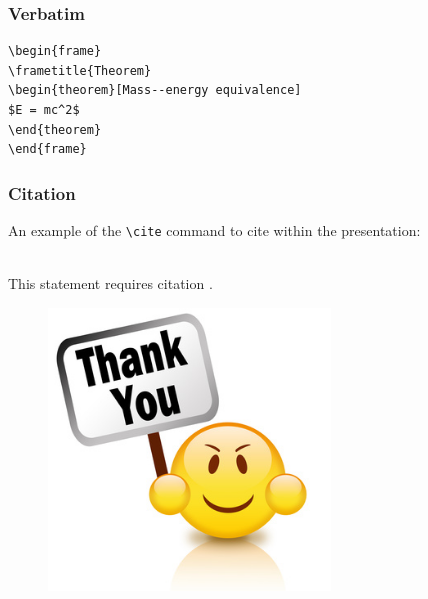 \documentclass{beamer}
\begin{document}

\begin{frame}[fragile] %
\frametitle{Verbatim}
\begin{example}
\begin{verbatim}
\begin{frame}
\frametitle{Theorem}
\begin{theorem}[Mass--energy equivalence]
$E = mc^2$
\end{theorem}
\end{frame}\end{verbatim}
\end{example}
\end{frame}




\begin{frame}[fragile] %
\frametitle{Citation}
An example of the \verb|\cite| command to cite within the presentation:\\~

This statement requires citation \cite{p1}.
\end{frame}


\fi


\begin{frame}
\begin{figure}
\includegraphics[width=0.7\linewidth, height=7.5cm]{figures/thankyou}
\end{figure}
\end{frame}

\end{document}
